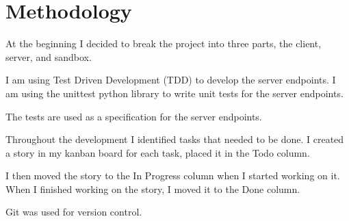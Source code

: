\chapter{Methodology}

At the beginning I decided to break the project into three parts, the client, server, and sandbox.

I am using Test Driven Development (TDD) to develop the server endpoints.
I am using the unittest python library to write unit tests for the server endpoints.

The tests are used as a specification for the server endpoints.

Throughout the development I identified tasks that needed to be done.
I created a story in my kanban board for each task, placed it in the Todo column.

I then moved the story to the In Progress column when I started working on it.
When I finished working on the story, I moved it to the Done column.

Git was used for version control.


